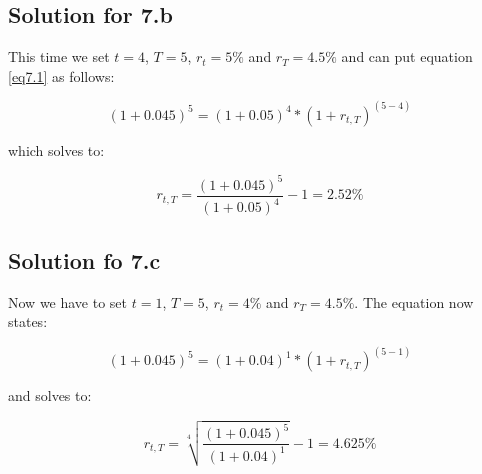 \documentclass[a4paper,11pt,twoside]{article}
\begin{document}
\subsection{Solution for 7.b}

This time we set $t = 4$, $T = 5$, $r_t = 5\%$ and $r_T = 4.5\%$ and can put equation \ref{eq7.1} as follows:

 \begin{equation}
(1+0.045)^5 = (1+0.05)^4*(1+r_{t,T})^{(5-4)}
\end{equation}

which solves to:

\begin{equation}
r_{t,T} = \frac{(1+0.045)^5}{(1+0.05)^4}-1 = 2.52\%
\end{equation}

\subsection{Solution fo 7.c}

Now we have to set $t=1$, $T=5$, $r_t = 4\%$ and $r_T = 4.5\%$. The equation now states:

 \begin{equation}
(1+0.045)^5 = (1+0.04)^1*(1+r_{t,T})^{(5-1)}
\end{equation}

and solves to:

\begin{equation}
r_{t,T} = \sqrt[4]{\frac{(1+0.045)^5}{(1+0.04)^1}}-1 = 4.625\%
\end{equation}






\end{document}
